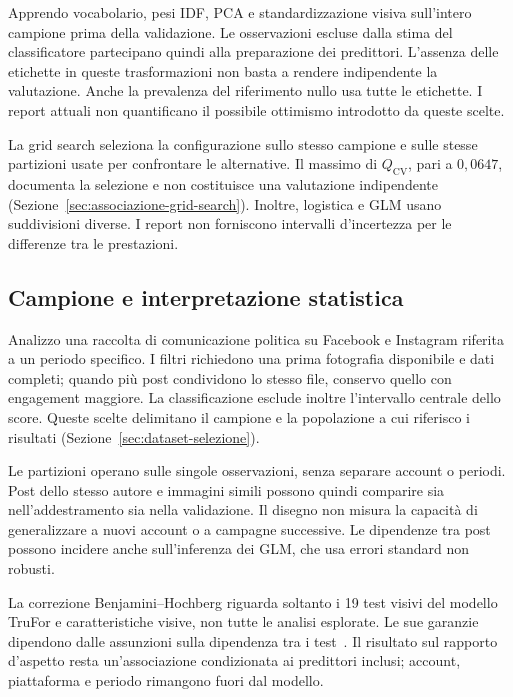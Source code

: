Apprendo vocabolario, pesi IDF, PCA e standardizzazione visiva sull'intero campione prima della validazione. Le osservazioni escluse dalla stima del classificatore partecipano quindi alla preparazione dei predittori. L'assenza delle etichette in queste trasformazioni non basta a rendere indipendente la valutazione. Anche la prevalenza del riferimento nullo usa tutte le etichette. I report attuali non quantificano il possibile ottimismo introdotto da queste scelte.

La grid search seleziona la configurazione sullo stesso campione e sulle stesse partizioni usate per confrontare le alternative. Il massimo di $Q_{\mathrm{CV}}$, pari a $0{,}0647$, documenta la selezione e non costituisce una valutazione indipendente (Sezione~\ref{sec:associazione-grid-search}). Inoltre, logistica e GLM usano suddivisioni diverse. I report non forniscono intervalli d'incertezza per le differenze tra le prestazioni.

\subsection{Campione e interpretazione statistica}
\label{subsec:limiti-campione}

Analizzo una raccolta di comunicazione politica su Facebook e Instagram riferita a un periodo specifico. I filtri richiedono una prima fotografia disponibile e dati completi; quando più post condividono lo stesso file, conservo quello con engagement maggiore. La classificazione esclude inoltre l'intervallo centrale dello score. Queste scelte delimitano il campione e la popolazione a cui riferisco i risultati (Sezione~\ref{sec:dataset-selezione}).

Le partizioni operano sulle singole osservazioni, senza separare account o periodi. Post dello stesso autore e immagini simili possono quindi comparire sia nell'addestramento sia nella validazione. Il disegno non misura la capacità di generalizzare a nuovi account o a campagne successive. Le dipendenze tra post possono incidere anche sull'inferenza dei GLM, che usa errori standard non robusti.

La correzione Benjamini--Hochberg riguarda soltanto i 19 test visivi del modello TruFor e caratteristiche visive, non tutte le analisi esplorate. Le sue garanzie dipendono dalle assunzioni sulla dipendenza tra i test~\cite{10.1111/j.2517-6161.1995.tb02031.x}. Il risultato sul rapporto d'aspetto resta un'associazione condizionata ai predittori inclusi; account, piattaforma e periodo rimangono fuori dal modello.

